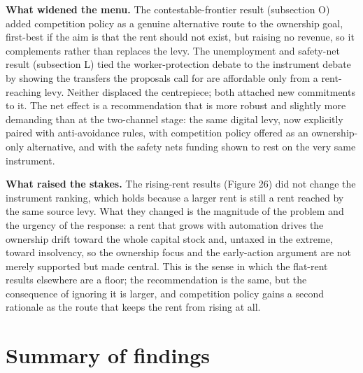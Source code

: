 \documentclass[12pt]{article}
\begin{document}
\textbf{What widened the menu.} The contestable-frontier result
(subsection O) added competition policy as a genuine alternative route
to the ownership goal, first-best if the aim is that the rent should not
exist, but raising no revenue, so it complements rather than replaces
the levy. The unemployment and safety-net result (subsection L) tied the
worker-protection debate to the instrument debate by showing the
transfers the proposals call for are affordable only from a
rent-reaching levy. Neither displaced the centrepiece; both attached new
commitments to it. The net effect is a recommendation that is more
robust and slightly more demanding than at the two-channel stage: the
same digital levy, now explicitly paired with anti-avoidance rules, with
competition policy offered as an ownership-only alternative, and with
the safety net\textquotesingle s funding shown to rest on the very same
instrument.

\leavevmode{}%
\textbf{What raised the stakes.} The rising-rent results (Figure 26) did
not change the instrument ranking, which holds because a larger rent is
still a rent reached by the same source levy. What they changed is the
magnitude of the problem and the urgency of the response: a rent that
grows with automation drives the ownership drift toward the whole
capital stock and, untaxed in the extreme, toward insolvency, so the
ownership focus and the early-action argument are not merely supported
but made central. This is the sense in which the flat-rent results
elsewhere are a floor; the recommendation is the same, but the
consequence of ignoring it is larger, and competition policy gains a
second rationale as the route that keeps the rent from rising at all.

\hypertarget{summary-of-findings}{%
\section{Summary of findings}\label{summary-of-findings}}
\end{document}
